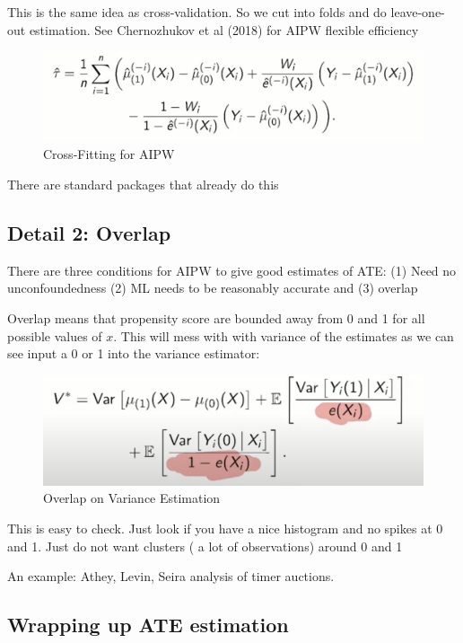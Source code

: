 \documentclass{article}
\begin{document}
This is the same idea as cross-validation. So we cut into folds and do leave-one-out estimation. See Chernozhukov et al (2018) for AIPW flexible efficiency


\begin{figure}[H]
    \centering
    \includegraphics[scale = 0.3]{cross_fitting.png}
    \caption{Cross-Fitting for AIPW}
    \label{fig:cross_fitting}
\end{figure}

There are standard packages that already do this


\subsection{Detail 2: Overlap}

There are three conditions for AIPW to give good estimates of ATE: (1) Need no unconfoundedness (2) ML needs to  be reasonably accurate and (3) overlap

Overlap means that propensity score are bounded away from 0 and 1 for all possible values of $x$. This will mess with with variance of the estimates as we can see input a 0 or 1 into the variance estimator:

\begin{figure}[H]
    \centering
    \includegraphics[scale = 0.3]{overlap_variance.png}
    \caption{Overlap on Variance Estimation}
    \label{fig:overlap}
\end{figure}


This is easy to check. Just look if you have a nice histogram and no spikes at 0 and 1. Just do not want clusters ( a lot of observations) around 0 and 1

An example: Athey, Levin, Seira analysis of timer auctions. 

\subsection{Wrapping up ATE estimation}
\end{document}
